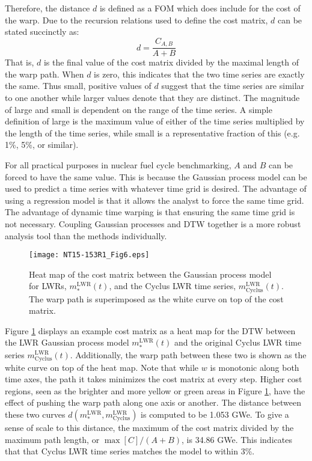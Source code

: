 \documentclass{ntmanuscript}
\newcommand{\LWR}{\mathrm{LWR}}
\newcommand{\CYCLUS}{\mathrm{Cyclus}}
\begin{document}
Therefore, the distance $d$ is defined as a FOM which does include for the cost of the
warp.  Due to the recursion relations used to define the cost matrix, $d$ can be
stated succinctly as:
\begin{equation}
\label{d-calc}
d = \frac{C_{A,B}}{A + B}
\end{equation}
That is, $d$ is the final value of the cost matrix divided by the maximal length
of the warp path. When $d$ is zero, this indicates that the two time series
are exactly the same. Thus small, positive values of $d$ suggest that the
time series are similar to one another while larger values denote that they
are distinct. The magnitude of large and small is dependent on the range of
the time series. A simple definition of large is the maximum
value of either of the time series multiplied by the length of the time series,
while small is a representative fraction of this (e.g. 1\%, 5\%, or similar).

For all practical purposes in nuclear fuel cycle benchmarking, $A$ and $B$ can be
forced to have the same
value. This is because the Gaussian process model can be used to predict a time series
with whatever time grid is desired.  The advantage of using a regression model
is that it allows the analyst to force the same time grid.  The advantage of
dynamic time warping is that ensuring the same time grid is not necessary.
Coupling Gaussian processes and DTW together is a more robust analysis tool
than the methods individually.

\begin{figure}[htb]
\centering
\texttt{[image: NT15-153R1\_Fig6.eps]}
\caption{Heat map of the cost matrix between the Gaussian process model
for LWRs, $m_*^\LWR(t)$, and the Cyclus LWR time series, $m_\CYCLUS^\LWR(t)$.
The warp path is superimposed as the white curve on top of the cost matrix.}
\label{cost-lwr-model-to-lwr-cyclus}
\end{figure}

Figure \ref{cost-lwr-model-to-lwr-cyclus} displays an example cost matrix
as a heat map for the DTW between the LWR Gaussian process model
$m_*^\LWR(t)$ and the original Cyclus LWR time series $m_\CYCLUS^\LWR(t)$.
Additionally, the warp path between these two is shown as the white curve
on top of the heat map. Note that while $w$ is monotonic along both time axes, the
path it takes minimizes the cost matrix at every step. Higher cost regions,
seen as the brighter and more yellow or green areas in Figure \ref{cost-lwr-model-to-lwr-cyclus},
have the effect of pushing the warp path along one axis or another. The
distance between these two curves $d(m_*^\LWR, m_\CYCLUS^\LWR)$ is computed
to be 1.053 GWe. To give a sense of scale to this distance, the maximum of
the cost matrix divided by the
maximum path length, or $\max[C]/(A+B)$, is 34.86 GWe.  This
indicates that that Cyclus LWR time series matches the model to within 3\%.
\end{document}
